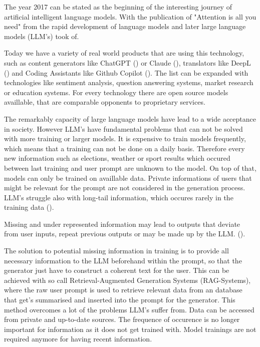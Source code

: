 The year 2017 can be stated as the beginning of the interesting journey of artificial intelligent language models. With the publication of "Attention is all you need" from \citet{vaswani2023attentionneed} the rapid development of language models and later large language models (LLM's) took of. 

Today we have a variety of real world products that are using this technology, such as content generators like ChatGPT (\citet{OpenAI_2022}) or Claude (\citet{Anthropic_2023}), translators like DeepL (\citet{DeepL_SE}) and Coding Assistants like Github Copilot (\citet{Friedman_2022}). The list can be expanded with technologies like sentiment analysis, question answering systems, market research or education systems. For every technology there are open source models availlable, that are comparable opponents to proprietary services. 

The remarkably capacity of large language models have lead to a wide acceptance in society. However LLM's have fundamental problems that can not be solved with more training or larger models. It is expensive to train models frequently, which means that a training can not be done on a daily basis. Therefore every new information such as elections, weather or sport results which occured between last training and user prompt are unknown to the model. On top of that, models can only be trained on availlable data. Private informations of users that might be relevant for the prompt are not considered in the generation process. LLM's struggle also with long-tail information, which occures rarely in the training data (\citet{Kandpal.15.11.2022}).

Missing and under represented information may lead to outputs that deviate from user inputs, repeat previous outputs or may be made up by the LLM. (\citet{Zhang.03.09.2023}). 

The solution to potential missing information in training is to provide all necessary information to the LLM beforehand within the prompt, so that the generator just have to construct a coherent text for the user. This can be achieved with so call Retrieval-Augmented Generation Systems (RAG-Systems), where the raw user prompt is used to retrieve relevant data from an database that get's summarised and inserted into the prompt for the generator. This method overcomes a lot of the problems LLM's suffer from. Data can be accessed from private and up-to-date sources. The frequence of occurence is no longer important for information as it does not get trained with. Model trainings are not required anymore for having recent information. 

